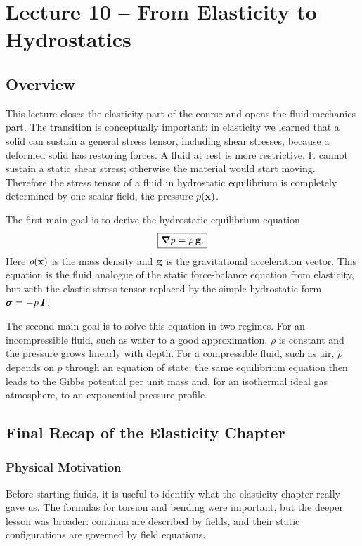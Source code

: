 \documentclass[../main.tex]{subfiles}
\begin{document}
\section{Lecture 10 -- From Elasticity to Hydrostatics}\label{sec:lec10}
\date{May 11, 2026}

\subsection*{Overview}
This lecture closes the elasticity part of the course and opens the fluid-mechanics part. The transition is conceptually important: in elasticity we learned that a solid can sustain a general stress tensor, including shear stresses, because a deformed solid has restoring forces. A fluid at rest is more restrictive. It cannot sustain a static shear stress; otherwise the material would start moving. Therefore the stress tensor of a fluid in hydrostatic equilibrium is completely determined by one scalar field, the pressure $p(\mathbf{x})$.

The first main goal is to derive the hydrostatic equilibrium equation
\begin{equation}
  \boxed{\grad p = \rho\,\mathbf{g}.}
  \label{eq:lec10_hydrostatic_equilibrium_intro}
\end{equation}
Here $\rho(\mathbf{x})$ is the mass density and $\mathbf{g}$ is the gravitational acceleration vector. This equation is the fluid analogue of the static force-balance equation from elasticity, but with the elastic stress tensor replaced by the simple hydrostatic form $\boldsymbol{\sigma}=-p\,\boldsymbol{I}$.

The second main goal is to solve this equation in two regimes. For an incompressible fluid, such as water to a good approximation, $\rho$ is constant and the pressure grows linearly with depth. For a compressible fluid, such as air, $\rho$ depends on $p$ through an equation of state; the same equilibrium equation then leads to the Gibbs potential per unit mass and, for an isothermal ideal gas atmosphere, to an exponential pressure profile.

\subsection{Final Recap of the Elasticity Chapter}\label{sec:lec10:elasticity-recap}

\subsubsection*{Physical Motivation}
Before starting fluids, it is useful to identify what the elasticity chapter really gave us. The formulas for torsion and bending were important, but the deeper lesson was broader: continua are described by fields, and their static configurations are governed by field equations.
\end{document}
